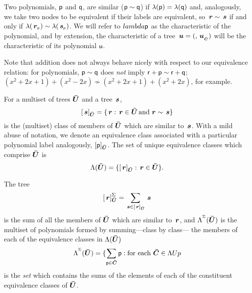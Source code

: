 \begin{definition}
  Two polynomials, $\mathsf{p}$ and $\mathsf{q}$, are similar ($\mathsf{p}
  \sim \mathsf{q}$) if $\lambda(\mathsf{p}) = \lambda(\mathsf{q})$ and,
  analogously, we take two nodes to be equivalent if their labels are
  equivalent, so $\,\boldsymbol{r}\sim\,\boldsymbol{s}$ if and only if
  $\lambda({\,\boldsymbol{r}}_{{}_{\mathsf{P}}}) \sim \lambda({\,\boldsymbol{s}}_{{}_{\mathsf{P}}})$. We will refer to
  $lambda{\mathsf{p}}$ as the characteristic of the polynomial, and by
  extension, the characteristic of a tree $\,\boldsymbol{u} = (\label{u},
  {\,\boldsymbol{u}}_{{}_{\bar{\boldsymbol{C}}}})$ will be the characteristic of its polynomial $\mathsf{u}$.
  
  Note that addition does not always behave nicely with respect to our
  equivalence relation: for polynomials,
  $\mathsf{p} \sim \mathsf{q}$ does \emph{not} imply $\mathsf{r} + \mathsf{p}
  \sim \mathsf{r} + \mathsf{q}$; $(x^2 + 2x + 1) + (x^2 - 2x) \nsim (x^2 +
  2x + 1) + (x^2 + 2x)$, for example.
\end{definition}

\begin{definition}\label{setofequivclasses}
  For a multiset of trees $\boldsymbol{\bar{U}}$ and a
  tree $\,\boldsymbol{s}$,
  \begin{equation*}
    \left[\,\boldsymbol{s}\right]_{\boldsymbol{\bar{U}}} = \{\,\boldsymbol{r}: \,\boldsymbol{r}\in\boldsymbol{\bar{U}} \operatorname{\text{and}} \,\boldsymbol{r}\sim\,\boldsymbol{s}\}
  \end{equation*}
  is the (multiset) class of members of $\boldsymbol{\bar{U}}$ which are similar to
  $\,\boldsymbol{s}$.  With a mild abuse of notation, we denote an
  equivalence class associated with a particular polynomial label
  analogously, $\left[\mathsf{p}\right]_{\boldsymbol{\bar{U}}}$.  The set of unique
  equivalence classes which comprise $\boldsymbol{\bar{U}}$ is
  \begin{equation*}\typeout{...Lambda}
    \Lambda(\multiset{U}) = \{\eqc{\node{r}}_{\multiset{U}}: \node{r}\in\multiset{U}\}.
  \end{equation*}
\end{definition}

\begin{definition}\label{sumsimilars}
  The tree \[
  \left[\,\boldsymbol{r}\right]_{\boldsymbol{\bar{U}}}^{\Sigma}=\sum_{\,\boldsymbol{s}\in\left[\,\boldsymbol{r}\right]_{\boldsymbol{\bar{U}}}}\,\boldsymbol{s}
  \] is the sum of all the members of $\boldsymbol{\bar{U}}$ which are similar to
  $\,\boldsymbol{r}$, and $\Lambda^{{}^{\Sigma}}(\boldsymbol{\bar{U}})$ is the multiset of polynomials
  formed by summing---class by class--- the members of each of the
  equivalence classes in $\Lambda(\boldsymbol{\bar{U}})$
  \begin{equation*}
    \Lambda^{{}^{\Sigma}}(\boldsymbol{\bar{U}}) = \{\sum_{\substack{\mathsf{p}\in\boldsymbol{\bar{C}}}}\mathsf{p}: \text{for each }\boldsymbol{\bar{C}}\in\Lambda{U}
  p\end{equation*}
  is the \emph{set} which contains the sums of the elements of each of
  the constituent equivalence classes of $\boldsymbol{\bar{U}}$.
\end{definition}
    
